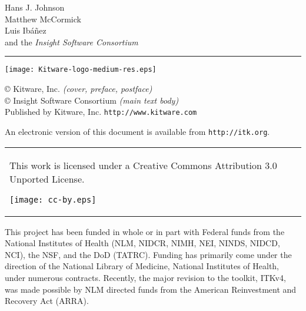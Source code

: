 \hfill
\begin{minipage}[t][6cm][b]{0.6\textwidth}
\Large
\renewcommand{\baselinestretch}{1.5}
Hans J. Johnson\\
Matthew McCormick \\
Luis Ib\'{a}\~{n}ez\\
and the \emph{Insight Software Consortium}
\normalsize
\end{minipage}


\begin{minipage}[t][2cm][b]{\textwidth}
\rule{14cm}{1pt}
\end{minipage}

\newpage

\begin{minipage}[t][4cm][b]{\textwidth}
\begin{center}
\texttt{[image: Kitware-logo-medium-res.eps]}
\end{center}
\par
\begin{center}
\large

\copyright \the\year \; Kitware, Inc. \emph{(cover, preface, postface)}\\
\copyright \the\year \; Insight Software Consortium \emph{(main text body)}\\
Published by Kitware, Inc. \texttt{http://www.kitware.com}
\normalsize
\end{center}
\end{minipage}


\begin{minipage}[t][2.25cm][b]{\textwidth}
\begin{center}
An electronic version of this document is available from
\texttt{http://itk.org}.
\end{center}
\begin{tabular}{p{}}
This work is licensed under a Creative Commons Attribution 3.0 Unported License.
\begin{center}
\texttt{[image: cc-by.eps]}
\end{center}\\
\end{tabular}
\end{minipage}


\begin{minipage}[t][2.5cm][b]{\textwidth}
\begin{center}
This project has been funded in whole or in part with Federal funds from the
National Institutes of Health (NLM, NIDCR, NIMH, NEI, NINDS, NIDCD, NCI), the
NSF, and the DoD (TATRC). Funding has primarily come under the direction of the
National Library of Medicine, National Institutes of Health, under numerous
contracts. Recently, the major revision to the toolkit, ITKv4, was made
possible by NLM directed funds from the American Reinvestment and Recovery Act
(ARRA).
\end{center}
\end{minipage}


